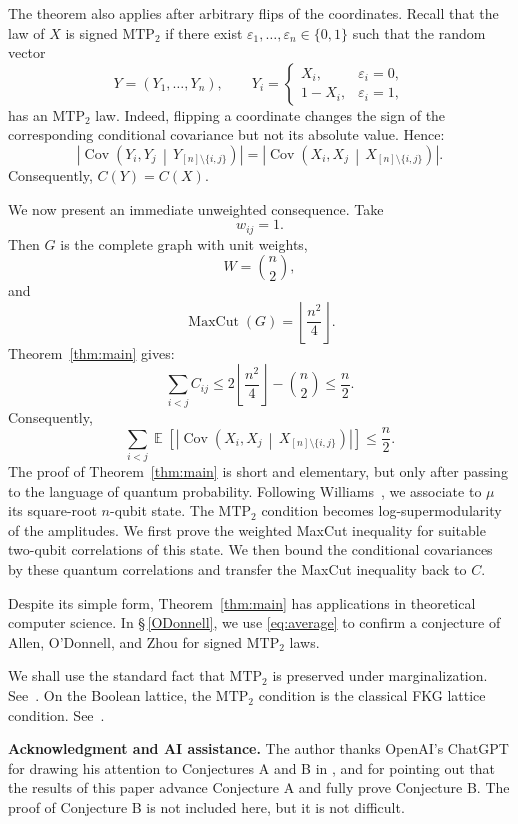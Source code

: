 \documentclass[12pt,reqno]{amsart}
\numberwithin{equation}{section}
\DeclareMathOperator{\E}{\mathbb{E}}
\DeclareMathOperator{\Cov}{Cov} \newcommand{\MTP}{\mathrm{MTP}_2}
\begin{document}
The theorem also applies after arbitrary flips of the coordinates. Recall that the law of \(X\) is signed \(\MTP\) if there exist
\(\varepsilon_1,\ldots,\varepsilon_n\in\{0,1\}\) such that the random vector
\[
Y=(Y_1,\ldots,Y_n),
\qquad
Y_i=
\begin{cases}
X_i, & \varepsilon_i=0,\\
1-X_i, & \varepsilon_i=1,
\end{cases}
\]
has an \(\MTP\) law. Indeed, flipping a coordinate changes the sign of the corresponding
conditional covariance but not its absolute value. Hence:
\[
\left|
\Cov\!\left(
Y_i,Y_j
\,\middle|\,
Y_{[n]\setminus\{i,j\}}
\right)
\right|
=
\left|
\Cov\!\left(
X_i,X_j
\,\middle|\,
X_{[n]\setminus\{i,j\}}
\right)
\right|.
\]
Consequently, \(C(Y)=C(X)\).
\smallskip%

We now present an immediate unweighted consequence. Take
\[
w_{ij}=1.
\]
Then \(G\) is the complete graph with unit weights,
\[
W=\binom n2,
\]
and
\[
\operatorname{MaxCut}(G)
=
\left\lfloor\frac{n^2}{4}\right\rfloor.
\]
Theorem~\ref{thm:main} gives:
\[
\sum_{i<j}C_{ij}
\le
2\left\lfloor\frac{n^2}{4}\right\rfloor
-
\binom n2 \le
\frac n2.
\]
Consequently,
\begin{equation}\label{eq:average}
\sum_{i<j}
\E\!\left[
\left|
\Cov\!\left(
X_i,X_j
\,\middle|\,
X_{[n]\setminus\{i,j\}}
\right)
\right|
\right]
\le
\frac n2.
\end{equation}
The proof of Theorem~\ref{thm:main} is short and elementary, but only after passing to the language of quantum probability. Following Williams~\cite[Chapter~10]{Williams}, we associate to \(\mu\) its 
square-root \(n\)-qubit state. The \(\MTP\) condition becomes log-supermodularity of the amplitudes. We first prove the weighted MaxCut inequality for suitable two-qubit
correlations of this state. We then bound the conditional covariances by these quantum correlations and transfer the MaxCut inequality back to \(C\).
\smallskip%

Despite its simple form, Theorem~\ref{thm:main} has applications in theoretical computer science. In \S\,\ref{ODonnell}, we use
\eqref{eq:average} to confirm a conjecture of Allen, O'Donnell, and Zhou for signed \(\MTP\) laws.
\smallskip%

We shall use the standard fact that \(\MTP\) is preserved under marginalization. See~\cite{Karlin-Rinott}. On the Boolean lattice, the \(\MTP\) condition is the classical FKG lattice condition. See~\cite{FKG, Grimmett}.

\medskip
\noindent\textbf{Acknowledgment and AI assistance.}
The author thanks OpenAI's ChatGPT for drawing his attention to Conjectures A and B in \cite{AllenODonnell}, and for pointing out that the results of this paper advance Conjecture A and fully prove Conjecture B. The proof of Conjecture B is not included here, but it is not difficult.
\end{document}
